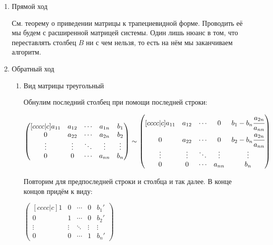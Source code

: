 \documentclass[twoside]{book}
\begin{document}
\begin{enumerate}
    \item Прямой ход

          См. теорему о приведении матрицы к трапециевидной форме. Проводить её мы будем с расширенной матрицей системы. Один лишь нюанс в том, что переставлять столбец \(B\) ни с чем нельзя, то есть на нём мы заканчиваем алгоритм.

    \item Обратный ход

          \begin{enumerate}
              \item Вид матрицы треугольный

                    Обнулим последний столбец при помощи последней строки:

                    \(
                    \begin{pmatrix}[cccc|c]
                        a_{11} & a_{12} & \cdots & a_{1n} & b_1    \\
                        0      & a_{22} & \cdots & a_{2n} & b_2    \\
                        \vdots & \vdots & \ddots & \vdots & \vdots \\
                        0      & 0      & \cdots & a_{nn} & b_n
                    \end{pmatrix} \sim
                    \begin{pmatrix}[cccc|c]
                        a_{11} & a_{12} & \cdots & 0      & b_1 - b_n \cfrac{a_{2n}}{a_{nn}} \\
                        0      & a_{22} & \cdots & 0      & b_2 - b_n \cfrac{a_{2n}}{a_{nn}} \\
                        \vdots & \vdots & \ddots & \vdots & \vdots                           \\
                        0      & 0      & \cdots & a_{nn} & b_n
                    \end{pmatrix}
                    \)

                    Повторим для предпоследней строки и столбца и так далее. В конце концов придём к виду:

                    \(
                    \begin{pmatrix}[cccc|c]
                        1      & 0      & \cdots & 0      & b_1'   \\
                        0      & 1      & \cdots & 0      & b_2'   \\
                        \vdots & \vdots & \ddots & \vdots & \vdots \\
                        0      & 0      & \cdots & 1      & b_n'
                    \end{pmatrix}
                    \)


\end{enumerate}
\end{enumerate}
\end{document}
